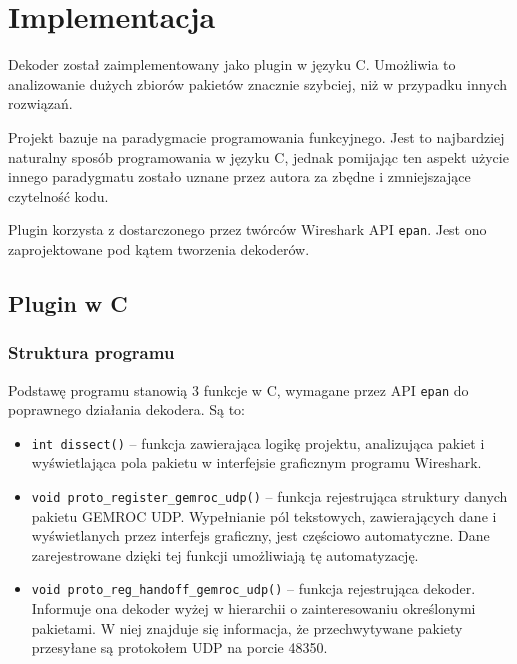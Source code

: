 \documentclass[a4paper, 12pt, twoside, openright]{article}
\begin{document}
\newpage
\section{Implementacja}

Dekoder został zaimplementowany jako plugin w języku C. Umożliwia to analizowanie dużych zbiorów pakietów znacznie
szybciej, niż w przypadku innych rozwiązań.

Projekt bazuje na paradygmacie programowania funkcyjnego. Jest to najbardziej naturalny sposób programowania w języku C,
jednak pomijając ten aspekt użycie innego paradygmatu zostało uznane przez autora za zbędne i zmniejszające czytelność kodu.

Plugin korzysta z dostarczonego przez twórców Wireshark API \texttt{epan}. Jest ono zaprojektowane pod kątem tworzenia dekoderów.



\newpage
\subsection{Plugin w C}
\indent\par
\subsubsection{Struktura programu}

\indent\par
Podstawę programu stanowią 3 funkcje w C, wymagane przez API \texttt{epan} do poprawnego działania dekodera. Są to:
\begin{itemize}
	\item \texttt{int dissect()} -- funkcja zawierająca logikę projektu, analizująca pakiet i wyświetlająca
		pola pakietu w interfejsie graficznym programu Wireshark.
	\item \texttt{void proto\_register\_gemroc\_udp()} -- funkcja rejestrująca struktury danych pakietu GEMROC UDP.
		Wypełnianie pól tekstowych, zawierających dane i wyświetlanych przez interfejs graficzny, jest częściowo
		automatyczne. Dane zarejestrowane dzięki tej funkcji umożliwiają tę automatyzację.
	\item \texttt{void proto\_reg\_handoff\_gemroc\_udp()} -- funkcja rejestrująca dekoder. Informuje ona dekoder wyżej
		w hierarchii o zainteresowaniu określonymi pakietami. W niej znajduje się informacja, że przechwytywane pakiety
		przesyłane są protokołem UDP na porcie 48350.
\end{itemize}
\end{document}
